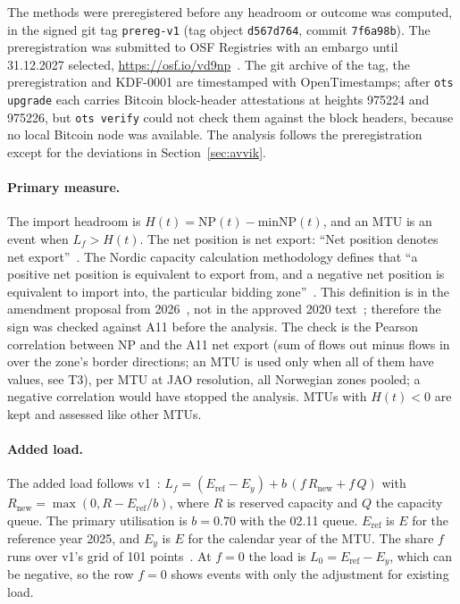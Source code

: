 The methods were preregistered before any headroom or outcome was computed, in the signed git tag \texttt{prereg-v1} (tag object \texttt{d567d764}, commit \texttt{7f6a98b}). %
The preregistration was submitted to OSF Registries with an embargo until 31.12.2027 selected, \url{https://osf.io/vd9np}~\cite{osf}. %
The git archive of the tag, the preregistration and KDF-0001 are timestamped with OpenTimestamps; after \texttt{ots upgrade} each carries Bitcoin block-header attestations at heights 975224 and 975226, but \texttt{ots verify} could not check them against the block headers, because no local Bitcoin node was available. %
The analysis follows the preregistration except for the deviations in Section~\ref{sec:avvik}.

\paragraph{Primary measure.}
The import headroom is $H(t) = \mathrm{NP}(t) - \mathrm{minNP}(t)$, and an MTU is an event when $L_f > H(t)$. %
The net position is net export: ``Net position denotes net export''~\cite{xu}. %
The Nordic capacity calculation methodology defines that ``a positive net position is equivalent to export from, and a negative net position is equivalent to import into, the particular bidding zone''~\cite{ccm2026}. %
This definition is in the amendment proposal from 2026~\cite{ccm2026}, not in the approved 2020 text~\cite{ccm2020}; therefore the sign was checked against A11 before the analysis. %
The check is the Pearson correlation between NP and the A11 net export (sum of flows out minus flows in over the zone's border directions; an MTU is used only when all of them have values, see T3), per MTU at JAO resolution, all Norwegian zones pooled; a negative correlation would have stopped the analysis. %
MTUs with $H(t) < 0$ are kept and assessed like other MTUs. %

\paragraph{Added load.}
The added load follows v1~\cite{v1}: $L_f = (E_{\mathrm{ref}} - E_y) + b\,(f\,R_{\mathrm{new}} + f\,Q)$ with $R_{\mathrm{new}} = \max(0, R - E_{\mathrm{ref}}/b)$, where $R$ is reserved capacity and $Q$ the capacity queue. %
The primary utilisation is $b = 0.70$ with the 02.11 queue. %
$E_{\mathrm{ref}}$ is $E$ for the reference year 2025, and $E_y$ is $E$ for the calendar year of the MTU. %
The share $f$ runs over v1's grid of 101 points~\cite{v1}. %
At $f = 0$ the load is $L_0 = E_{\mathrm{ref}} - E_y$, which can be negative, so the row $f = 0$ shows events with only the adjustment for existing load. %

